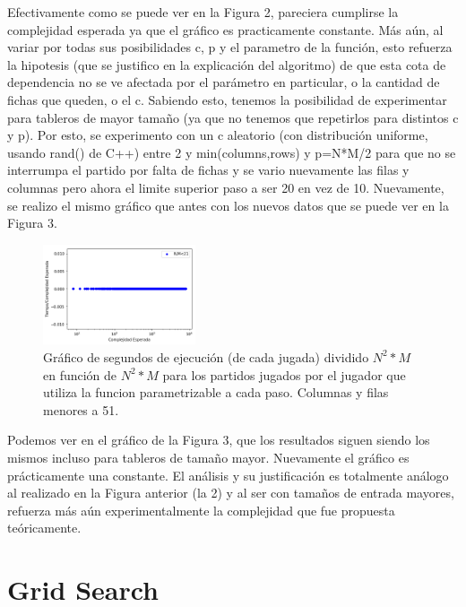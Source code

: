 \documentclass[A4paper,oneside,fleqn,11pt]{article}
\theoremstyle{definition}
\begin{document}
Efectivamente como se puede ver en la Figura 2, pareciera cumplirse la complejidad esperada ya que el gráfico es practicamente constante. Más aún,  al variar por todas sus posibilidades c, p y el parametro de la función, esto refuerza la hipotesis (que se justifico en la explicación del algoritmo) de que esta cota de dependencia no se ve afectada por el parámetro en particular, o la cantidad de fichas que queden, o el c. Sabiendo esto, tenemos la posibilidad de experimentar para tableros de mayor tamaño (ya que no tenemos que repetirlos para distintos c y p). Por esto, se experimento con un c aleatorio (con distribución uniforme, usando rand() de C++) entre 2 y min(columns,rows)  y p=N*M/2 para que no se interrumpa el partido por falta de fichas  y se vario nuevamente las filas y columnas pero ahora el limite superior paso a ser 20 en vez de 10. Nuevamente, se realizo el mismo gráfico que antes con los nuevos datos que se puede ver en la Figura 3.

\begin{figure}
	\includegraphics[width=0.4\textwidth]{complejidad2b.png}
	\caption{ Gráfico de segundos de ejecución (de cada jugada) dividido $N^2 *M$ en función de $N^2 * M$ para los partidos jugados por el jugador que utiliza la funcion parametrizable a cada paso. Columnas y filas menores a 51.}
\end{figure}

Podemos ver en el gráfico de la Figura 3, que los resultados siguen siendo los mismos incluso para tableros de tamaño mayor.  Nuevamente el gráfico es prácticamente una constante. El análisis y su justificación es totalmente análogo al realizado en la Figura anterior (la 2) y al ser con tamaños de entrada mayores, refuerza más aún experimentalmente la complejidad que fue propuesta teóricamente.






\section{Grid Search}
\end{document}
